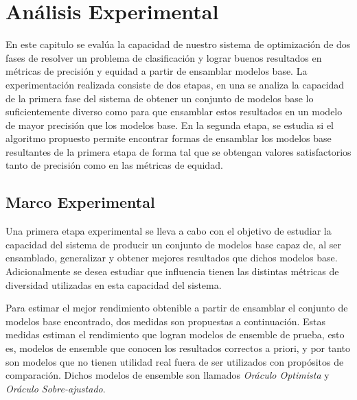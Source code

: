 \chapter{Análisis Experimental}\label{chapter:experiments}

En este capitulo se evalúa la capacidad de nuestro sistema de optimización de dos fases de resolver un problema de clasificación y lograr buenos resultados en métricas de precisión y equidad a partir de ensamblar modelos base.
La experimentación realizada consiste de dos etapas, en una se analiza la capacidad de la primera fase del sistema de obtener un conjunto de modelos base lo suficientemente diverso como para que ensamblar estos resultados en un modelo de mayor precisión que los modelos base.
En la segunda etapa, se estudia si el algoritmo propuesto permite encontrar formas de ensamblar los modelos base resultantes de la primera etapa de forma tal que se obtengan valores satisfactorios tanto de precisión como en las métricas de equidad.

\section{Marco Experimental}\label{section:experimental-framework}

Una primera etapa experimental se lleva a cabo con el objetivo de estudiar la capacidad del sistema de producir un conjunto de modelos base capaz de, al ser ensamblado, generalizar y obtener mejores resultados que dichos modelos base.
Adicionalmente se desea estudiar que influencia tienen las distintas métricas de diversidad utilizadas en esta capacidad del sistema.

Para estimar el mejor rendimiento obtenible a partir de ensamblar el conjunto de modelos base encontrado, dos medidas son propuestas a continuación.
Estas medidas estiman el rendimiento que logran modelos de ensemble de prueba, esto es, modelos de ensemble que conocen los resultados correctos a priori, y por tanto son modelos que no tienen utilidad real fuera de ser utilizados con propósitos de comparación.
Dichos modelos de ensemble son llamados \emph{Oráculo Optimista} y \emph{Oráculo Sobre-ajustado}.

